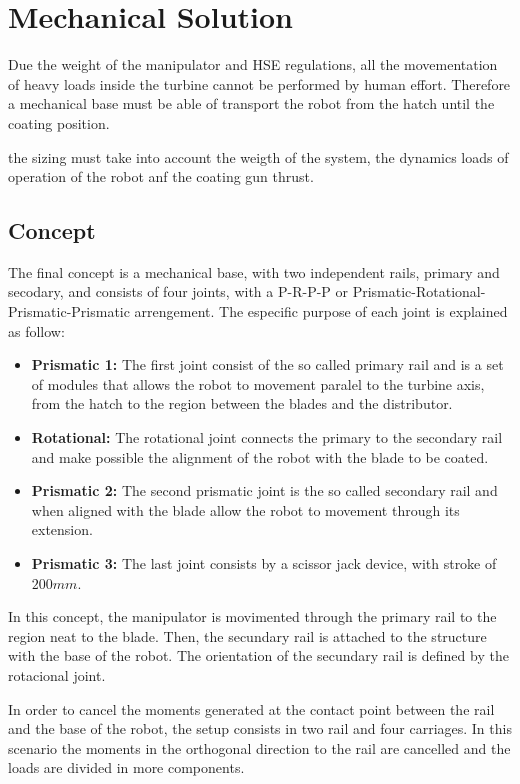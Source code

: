 \section{Mechanical Solution}

Due the weight of the manipulator and HSE regulations, all the movementation of
heavy loads inside the turbine cannot be performed by human effort. Therefore a
mechanical base must be able of transport the robot from the hatch until the
coating position. 

the sizing must take into account the weigth of the system, the dynamics loads
of operation of the robot anf the coating gun thrust.

\subsection{Concept}

The final concept is a mechanical base, with two independent rails, primary and
secodary, and consists of four joints, with a P-R-P-P or
Prismatic-Rotational-Prismatic-Prismatic arrengement. The especific purpose of each joint is explained as follow:

\begin{itemize}
  \item \textbf{Prismatic 1:} The first joint consist of the so called primary
  rail and is a set of modules that allows the robot to movement paralel to the
  turbine axis, from the hatch to the region between the blades and the
  distributor.
  \item \textbf{Rotational:} The rotational joint connects the primary to the
  secondary rail and make possible the alignment of the robot with the blade to
  be coated.
  \item \textbf{Prismatic 2:} The second prismatic joint is the so called
  secondary rail and when aligned with the blade allow the robot to movement
  through its extension.
  \item \textbf{Prismatic 3:} The last joint consists by a scissor jack device,
  with stroke of $200mm$.
\end{itemize}

In this concept, the manipulator is movimented through the primary rail to the
region neat to the blade. Then, the secundary rail is attached to the structure
with the base of the robot. The orientation of the secundary rail is defined by
the rotacional joint. 

In order to cancel the moments generated at the contact point between the rail
and the base of the robot, the setup consists in two rail and four carriages. In
this scenario the moments in the orthogonal direction to the rail are cancelled
and the loads are divided in more components.


